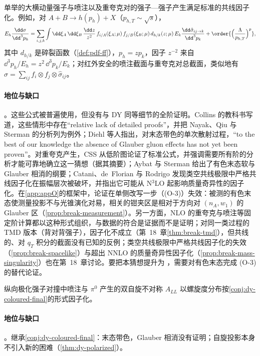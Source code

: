 \begin{conjecture}\label{conj:dy-coloured-final}
单举的大横动量强子与喷注以及重夸克对的强子—强子产生满足标准的共线因子化。例如，对 $A+B\to h(p_h)+X$（$p_{h,T}\sim\sqrt s$），
\[
E_h\frac{\dd\sigma}{\dd^3p_h}=\sum_{i,j,k}\int\dd\xi_A\,\dd\xi_B\,\frac{\dd z}{z^2}\,f_{i/A}(\xi_A;\mu)\,f_{j/B}(\xi_B;\mu)\,d_{h/k}(z;\mu)\,E_k\frac{\dd\hat\sigma_{ij\to k}}{\dd^3p_k}+\order{\Big(\frac{\Lambda}{p_{h,T}}\Big)^{p}},
\]
其中 $d_{h/k}$ 是碎裂函数（\cref{def:pdf-ff}），$p_h=zp_k$，因子 $z^{-2}$ 来自 $\dd^3p_h/E_h=z^2\,\dd^3p_k/E_k$；对红外安全的喷注截面与重夸克对总截面，类似地有 $\sigma=\sum_{ij}f_i\otimes f_j\otimes\hat\sigma_{ij}$。
\end{conjecture}

\paragraph{地位与缺口}\tagC。这些公式被普遍使用，但没有与 DY 同等细节的全阶证明。Collins 的教科书写道，这些情形中存在“relative lack of detailed proofs”，并把 Nayak、Qiu 与 Sterman 的分析\cite{NayakQiuSterman2005b}列为例外\cite[第~14.7~节，第~570--571~页]{Collins2011}；Diehl 等人指出，对末态带色的单次散射过程，“to the best of our knowledge the absence of Glauber gluon effects has not yet been proven”\cite[第~5~节]{Diehl:2015bca}。对重夸克产生，CSS 从低阶图论证了标准公式，并强调需要所有阶的分析才能可靠地确立这一猜想\cite{Collins:1985gm}（据其摘要）；Aybat 与 Sterman 给出了有色末态软与 Glauber 相消的纲要\cite{AybatSterman2009}；Catani、de~Florian 与 Rodrigo 发现类空共线极限中严格共线因子化在振幅层次被破坏，并指出它可能从 N$^3$LO 起影响质量奇异性的因子化\cite[第~8~节]{CataniDeFlorianRodrigo2012}。在\cref{app:appO}的框架中，论证在单侧改写一步（(O-3)）失效：被测的有色末态使测量投影不与光锥演化对易，相关的钳夹区是相对于方向对 $(n_A,w_1)$ 的 Glauber 区（\cref{prop:break-measurement}）。另一方面，NLO 的重夸克\cite{NasonDawsonEllis1988}与喷注\cite{Kang:2016mcy}等固定阶计算都以这种形式组织，与数据的符合是证据而不是证明；对同一类过程的 TMD 版本（背对背强子），因子化不成立（第~18~章\cref{thm:break-tmd}），但共线的、对 $q_T$ 积分的截面没有已知的反例；类空共线极限中严格共线因子化的失效（\cref{prop:break-spacelike}）与超出 NNLO 的质量奇异性因子化（\cref{prop:break-mass-singularity}）也在第~18~章讨论。要把本猜想提升为 \tagA，需要对有色末态完成 (O-3) 的替代论证。

\begin{conjecture}\label{conj:dy-polarized-jets}
纵向极化强子对撞中喷注与 $\pi^0$ 产生的双自旋不对称 $A_{LL}$ 以螺旋度分布按\cref{conj:dy-coloured-final}的形式因子化。
\end{conjecture}

\paragraph{地位与缺口}\tagC。继承\cref{conj:dy-coloured-final}：末态带色，Glauber 相消没有证明；自旋投影本身不引入新的困难（\cref{thm:dy-polarized}）。
